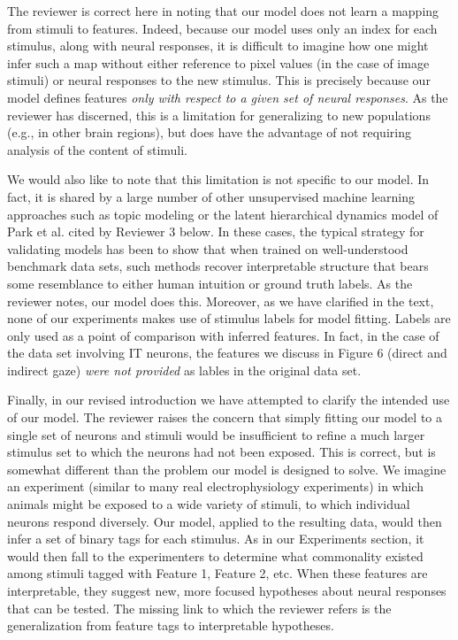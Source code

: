 \documentclass[12pt,a4paper]{article}
\newcommand{\edit}[1]{\textcolor{edit}{#1}}
\begin{document}
\edit{
The reviewer is correct here in noting that our model does not learn a mapping from stimuli to features. Indeed, because our model uses only an index for each stimulus, along with neural responses, it is difficult to imagine how one might infer such a map without either reference to pixel values (in the case of image stimuli) or neural responses to the new stimulus. This is precisely because our model defines features \emph{only with respect to a given set of neural responses}. As the reviewer has discerned, this is a limitation for generalizing to new populations (e.g., in other brain regions), but does have the advantage of not requiring analysis of the content of stimuli.
}

\edit{
We would also like to note that this limitation is not specific to our model. In fact, it is shared by a large number of other unsupervised machine learning approaches such as topic modeling or the latent hierarchical dynamics model of Park et al. cited by Reviewer 3 below. In these cases, the typical strategy for validating models has been to show that when trained on well-understood benchmark data sets, such methods recover interpretable structure that bears some resemblance to either human intuition or ground truth labels. As the reviewer notes, our model does this. Moreover, as we have clarified in the text, none of our experiments makes use of stimulus labels for model fitting. Labels are only used as a point of comparison with inferred features. In fact, in the case of the data set involving IT neurons, the features we discuss in Figure 6 (direct and indirect gaze) \emph{were not provided} as lables in the original data set.
}

\edit{
Finally, in our revised introduction we have attempted to clarify the intended use of our model. The reviewer raises the concern that simply fitting our model to a single set of neurons and stimuli would be insufficient to refine a much larger stimulus set to which the neurons had not been exposed. This is correct, but is somewhat different than the problem our model is designed to solve. We imagine an experiment (similar to many real electrophysiology experiments) in which animals might be exposed to a wide variety of stimuli, to which individual neurons respond diversely. Our model, applied to the resulting data, would then infer a set of binary tags for each stimulus. As in our Experiments section, it would then fall to the experimenters to determine what commonality existed among stimuli tagged with Feature 1, Feature 2, etc. When these features are interpretable, they suggest new, more focused hypotheses about neural responses that can be tested. The missing link to which the reviewer refers is the generalization from feature tags to interpretable hypotheses.
}
\end{document}
